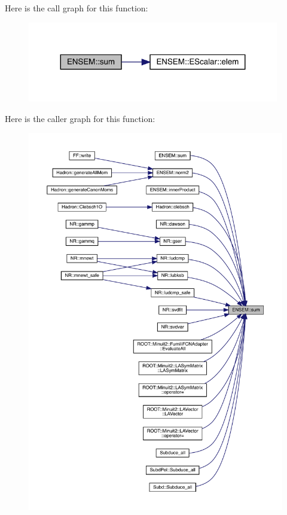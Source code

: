 Here is the call graph for this function\+:
\nopagebreak
\begin{figure}[H]
\begin{center}
\leavevmode
\includegraphics[width=311pt]{d4/dca/group__escalar_gae544517401e03767c9194bfe3736df37_cgraph}
\end{center}
\end{figure}
Here is the caller graph for this function\+:
\nopagebreak
\begin{figure}[H]
\begin{center}
\leavevmode
\includegraphics[width=350pt]{d4/dca/group__escalar_gae544517401e03767c9194bfe3736df37_icgraph}
\end{center}
\end{figure}
\mbox{\label{group__escalar_ga560632c018611046a7009dc56681b77d}} 

